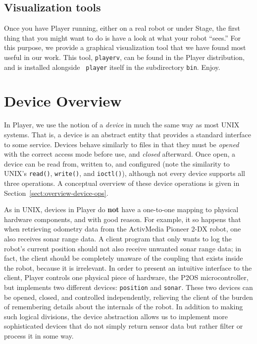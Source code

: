 \documentclass[11pt]{report}
\begin{document}
\section{Visualization tools}
Once you have Player running, either on a real robot or under Stage, the
first thing that you might want to do is have a look at what your robot
``sees.''  For this purpose, we provide a graphical visualization tool
that we have found most useful in our work.  This tool, {\tt playerv},
can be found in the Player distribution, and is installed alongside {\tt
player} itself in the subdirectory {\tt bin}.  Enjoy.
\chapter{Device Overview}
\label{chapt:devices}
In Player, we use the notion of a {\em device} in much the same way as most
UNIX systems.  That is, a device is an abstract entity that provides a standard
interface to some service.  Devices behave similarly to files in that they
must be {\em opened} with the correct access mode before use, and {\em closed}
afterward.  Once open, a device can be read from, written to, and configured
(note the similarity to UNIX's {\tt read()}, {\tt write()}, and {\tt ioctl()}),
although not every device supports all three operations.  A conceptual overview
of these device operations is given in Section~\ref{sect:overview-device-ops}.

As in UNIX, devices in Player do {\bf not} have a one-to-one mapping to
physical hardware components, and with good reason.  For example, it so
happens that when retrieving odometry data from the ActivMedia Pioneer 2-DX
robot, one also receives sonar range data.  A client program that only wants
to log the robot's current position should not also receive unwanted sonar
range data; in fact, the client should be completely unaware of the coupling
that exists inside the robot, because it is irrelevant.  In order to present
an intuitive interface to the client, Player controls one physical piece of
hardware, the P2OS microcontroller, but implements two different devices:
{\tt position} and {\tt sonar}.  These two devices can be opened, closed, and
controlled independently, relieving the client of the burden of remembering
details about the internals of the robot.  In addition to making such logical
divisions, the device abstraction allows us to implement more sophisticated
devices that do not simply return sensor data but rather filter or process
it in some way.
\end{document}
